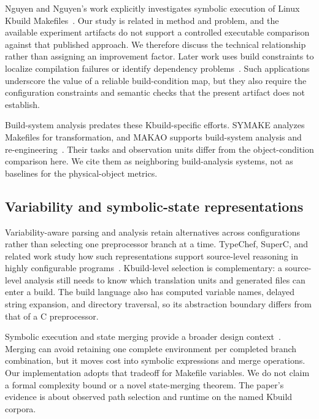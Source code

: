 \documentclass[acmsmall,screen,review]{acmart}
\begin{document}
Nguyen and Nguyen's work explicitly investigates symbolic execution of Linux Kbuild Makefiles~\cite{nguyen2020kbuild}. Our study is related in method and problem, and the available experiment artifacts do not support a controlled executable comparison against that published approach. We therefore discuss the technical relationship rather than assigning an improvement factor. Later work uses build constraints to localize compilation failures or identify dependency problems~\cite{gazzillo2018localizing,oh2021kclause,yildiran2021kismet}. Such applications underscore the value of a reliable build-condition map, but they also require the configuration constraints and semantic checks that the present artifact does not establish.

Build-system analysis predates these Kbuild-specific efforts. \textsc{SYMAKE} analyzes Makefiles for transformation, and \textsc{MAKAO} supports build-system analysis and re-engineering~\cite{tamrawi2012symake,adams2007makao}. Their tasks and observation units differ from the object-condition comparison here. We cite them as neighboring build-analysis systems, not as baselines for the physical-object metrics.

\subsection{Variability and symbolic-state representations}
Variability-aware parsing and analysis retain alternatives across configurations rather than selecting one preprocessor branch at a time. TypeChef, SuperC, and related work study how such representations support source-level reasoning in highly configurable programs~\cite{berger2010variability,kenner2010typechef,gazzillo2012superc,liebig2011variability}. Kbuild-level selection is complementary: a source-level analysis still needs to know which translation units and generated files can enter a build. The build language also has computed variable names, delayed string expansion, and directory traversal, so its abstraction boundary differs from that of a C preprocessor.

Symbolic execution and state merging provide a broader design context~\cite{king1976symbolic,kuznetsov2012efficient}. Merging can avoid retaining one complete environment per completed branch combination, but it moves cost into symbolic expressions and merge operations. Our implementation adopts that tradeoff for Makefile variables. We do not claim a formal complexity bound or a novel state-merging theorem. The paper's evidence is about observed path selection and runtime on the named Kbuild corpora.
\end{document}
